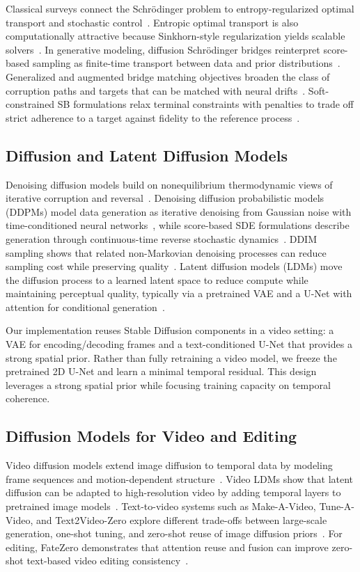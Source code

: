 \documentclass[journal]{IEEEtran}
\begin{document}
Classical surveys connect the Schr\"{o}dinger problem to entropy-regularized optimal transport and stochastic control~\cite{leonard2014survey}. Entropic optimal transport is also computationally attractive because Sinkhorn-style regularization yields scalable solvers~\cite{cuturi2013sinkhorn}. In generative modeling, diffusion Schr\"{o}dinger bridges reinterpret score-based sampling as finite-time transport between data and prior distributions~\cite{debortoli2021dsb}. Generalized and augmented bridge matching objectives broaden the class of corruption paths and targets that can be matched with neural drifts~\cite{liu2023generalized,debortoli2023augmented}. Soft-constrained SB formulations relax terminal constraints with penalties to trade off strict adherence to a target against fidelity to the reference process~\cite{garg2024softconstrained}.

\subsection{Diffusion and Latent Diffusion Models}
Denoising diffusion models build on nonequilibrium thermodynamic views of iterative corruption and reversal~\cite{sohldickstein2015deep}. Denoising diffusion probabilistic models (DDPMs) model data generation as iterative denoising from Gaussian noise with time-conditioned neural networks~\cite{ho2020ddpm}, while score-based SDE formulations describe generation through continuous-time reverse stochastic dynamics~\cite{song2021sde}. DDIM sampling shows that related non-Markovian denoising processes can reduce sampling cost while preserving quality~\cite{song2021ddim}. Latent diffusion models (LDMs) move the diffusion process to a learned latent space to reduce compute while maintaining perceptual quality, typically via a pretrained VAE and a U-Net with attention for conditional generation~\cite{rombach2022ldm}.

Our implementation reuses Stable Diffusion components in a video setting: a VAE for encoding/decoding frames and a text-conditioned U-Net that provides a strong spatial prior. Rather than fully retraining a video model, we freeze the pretrained 2D U-Net and learn a minimal temporal residual. This design leverages a strong spatial prior while focusing training capacity on temporal coherence.

\subsection{Diffusion Models for Video and Editing}
Video diffusion models extend image diffusion to temporal data by modeling frame sequences and motion-dependent structure~\cite{ho2022video}. Video LDMs show that latent diffusion can be adapted to high-resolution video by adding temporal layers to pretrained image models~\cite{blattmann2023videoldm}. Text-to-video systems such as Make-A-Video, Tune-A-Video, and Text2Video-Zero explore different trade-offs between large-scale generation, one-shot tuning, and zero-shot reuse of image diffusion priors~\cite{singer2022makeavideo,wu2023tuneavideo,khachatryan2023text2videozero}. For editing, FateZero demonstrates that attention reuse and fusion can improve zero-shot text-based video editing consistency~\cite{qi2023fatezero}.
\end{document}
